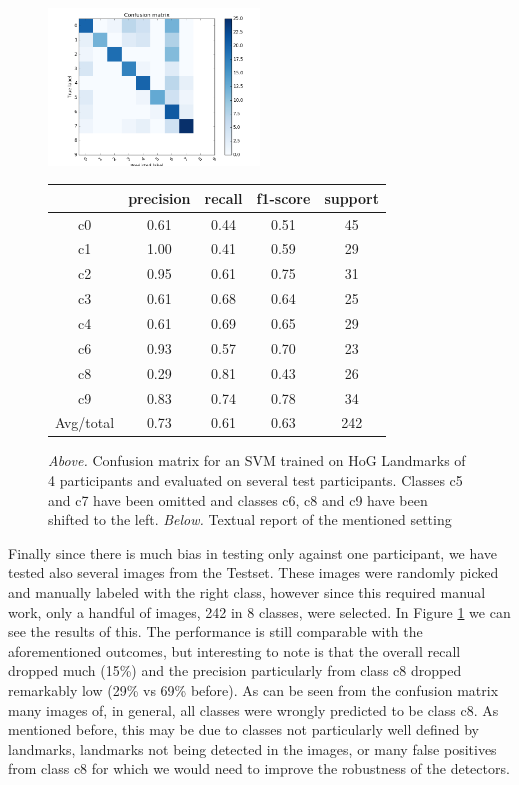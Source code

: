 \documentclass[10pt,twocolumn,letterpaper]{article}
\begin{document}
\begin{figure}[h]
	\centering
	\includegraphics[width=0.5\textwidth]{mult_HOG/4c01234689matTest}
		\begin{tabular}{c||c|c|c|c}
			& precision&recall&f1-score&support\\	\hline
			c0&0.61&0.44&0.51&45\\
			c1&1.00&0.41&0.59&29\\
			c2&0.95&0.61&0.75&31\\
			c3&0.61&0.68&0.64&25\\
			c4&0.61&0.69&0.65&29\\
			c6&0.93&0.57&0.70&23\\
			c8&0.29&0.81&0.43&26\\
			c9&0.83&0.74&0.78&34\\ \hline
			Avg/total &0.73&0.61& 0.63 &242
		\end{tabular}
	\caption{\textit{Above.} Confusion matrix for an SVM trained on HoG Landmarks of 4 participants and evaluated on several test participants. Classes c5 and c7 have been omitted and classes c6, c8 and c9 have been shifted to the left. \textit{Below.} Textual report of the mentioned setting}
	\label{Landmarks_4no5no7test}
\end{figure}

Finally since there is much bias in testing only against one participant, we have tested also several images from the Testset. These images were randomly picked and manually labeled with the right class, however since this required manual work, only a handful of images, 242 in 8 classes, were selected. In Figure \ref{Landmarks_4no5no7test} we can see the results of this. The performance is still comparable with the aforementioned outcomes, but interesting to note is that the overall recall dropped much (15\%) and the precision particularly from class c8 dropped remarkably low (29\% vs 69\% before). As can be seen from the confusion matrix many images of, in general, all classes were wrongly predicted to be class c8. As mentioned before, this may be due to classes not particularly well defined by landmarks, landmarks not being detected in the images, or many false positives from class c8 for which we would need to improve the robustness of the detectors.
\end{document}
